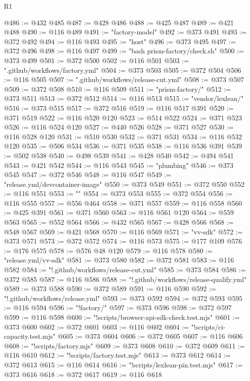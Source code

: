 \begin{lexlean}{R1}
\begin{coremodule}
@486 := @432 @485
@487 := @428 @486
@488 := @425 @487
@489 := @421 @488
@490 := @116 @489
@491 := "factory-model"
@492 := @373 @491
@493 := @372 @492
@494 := @116 @493
@495 := "host"
@496 := @373 @495
@497 := @372 @496
@498 := @116 @497
@499 := "bash prism-factory/check.sh"
@500 := @373 @499
@501 := @372 @500
@502 := @116 @501
@503 := ".github/workflows/factory.yml"
@504 := @373 @503
@505 := @372 @504
@506 := @116 @505
@507 := ".github/workflows/release-cut.yml"
@508 := @373 @507
@509 := @372 @508
@510 := @116 @509
@511 := "prism-factory/"
@512 := @373 @511
@513 := @372 @512
@514 := @116 @513
@515 := "vendor/lexlean/"
@516 := @373 @515
@517 := @372 @516
@519 := @116 @517 @391
@520 := @371 @519
@522 := @116 @520 @120
@523 := @514 @522
@524 := @371 @523
@526 := @116 @524 @120
@527 := @440 @526
@528 := @371 @527
@530 := @116 @528 @120
@531 := @510 @530
@532 := @371 @531
@534 := @116 @532 @120
@535 := @506 @534
@536 := @371 @535
@538 := @116 @536 @391
@539 := @502 @538
@540 := @498 @539
@541 := @428 @540
@542 := @494 @541
@543 := @421 @542
@544 := @116 @543
@545 := "plumbing"
@546 := @373 @545
@547 := @372 @546
@548 := @116 @547
@549 := "release.yml/devcontainer-image"
@550 := @373 @549
@551 := @372 @550
@552 := @116 @551
@553 := ""
@554 := @373 @553
@555 := @372 @554
@556 := @116 @555
@557 := @556 @464
@558 := @371 @557
@559 := @116 @558
@560 := @425 @391
@561 := @371 @560
@563 := @116 @561 @120
@564 := @559 @563
@565 := @552 @564
@566 := @432 @565
@567 := @428 @566
@568 := @548 @567
@569 := @421 @568
@570 := @116 @569
@571 := "vv-sdk"
@572 := @373 @571
@573 := @372 @572
@574 := @116 @573
@575 := @177 @109
@576 := @176 @575
@578 := @576 @48 @120
@579 := @116 @578
@580 := "release.yml/vv-sdk"
@581 := @373 @580
@582 := @372 @581
@583 := @116 @582
@584 := "!.github/workflows/release-cut.yml"
@585 := @373 @584
@586 := @372 @585
@587 := @116 @586
@588 := "!.github/workflows/release-qualify.yml"
@589 := @373 @588
@590 := @372 @589
@591 := @116 @590
@592 := "!.github/workflows/release.yml"
@593 := @373 @592
@594 := @372 @593
@595 := @116 @594
@596 := "!factory/"
@597 := @373 @596
@598 := @372 @597
@599 := @116 @598
@600 := "!scripts/browser-api-sdk-check.test.mjs"
@601 := @373 @600
@602 := @372 @601
@603 := @116 @602
@604 := "!scripts/ci-capacity.test.mjs"
@605 := @373 @604
@606 := @372 @605
@607 := @116 @606
@608 := "!scripts/factory.mjs"
@609 := @373 @608
@610 := @372 @609
@611 := @116 @610
@612 := "!scripts/factory.test.mjs"
@613 := @373 @612
@614 := @372 @613
@615 := @116 @614
@616 := "!scripts/lexlean-pin.test.mjs"
@617 := @373 @616
@618 := @372 @617
@619 := @116 @618

\end{coremodule}
\end{lexlean}
